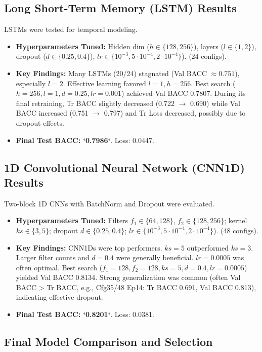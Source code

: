 \documentclass[11pt, a4paper]{article}
\begin{document}
\subsection{Long Short-Term Memory (LSTM) Results}
LSTMs were tested for temporal modeling.
\begin{itemize}
    \item \textbf{Hyperparameters Tuned:} Hidden dim ($h \in \{128, 256\}$), layers ($l \in \{1, 2\}$), dropout ($d \in \{0.25, 0.4\}$), $lr \in \{10^{-3}, 5 \cdot 10^{-4}, 2 \cdot 10^{-4}\}$). (24 configs).
    \item \textbf{Key Findings:} Many LSTMs (20/24) stagnated (Val BACC $\approx 0.751$), especially $l=2$. Effective learning favored $l=1, h=256$. Best search ($h=256, l=1, d=0.25, lr=0.001$) achieved Val BACC 0.7807. During its final retraining, Tr BACC slightly decreased (0.722 $\to$ 0.690) while Val BACC increased (0.751 $\to$ 0.797) and Tr Loss decreased, possibly due to dropout effects.
    \item \textbf{Final Test BACC: `0.7986`}. Loss: 0.0447.
\end{itemize}

\subsection{1D Convolutional Neural Network (CNN1D) Results}
\label{ssec:cnn1d_results}
Two-block 1D CNNs with BatchNorm and Dropout were evaluated.
\begin{itemize}
    \item \textbf{Hyperparameters Tuned:} Filters $f_1 \in \{64, 128\}$, $f_2 \in \{128, 256\}$; kernel $ks \in \{3, 5\}$; dropout $d \in \{0.25, 0.4\}$; $lr \in \{10^{-3}, 5 \cdot 10^{-4}, 2 \cdot 10^{-4}\}$). (48 configs).
    \item \textbf{Key Findings:} CNN1Ds were top performers. $ks=5$ outperformed $ks=3$. Larger filter counts and $d=0.4$ were generally beneficial. $lr=0.0005$ was often optimal. Best search ($f_1=128, f_2=128, ks=5, d=0.4, lr=0.0005$) yielded Val BACC 0.8134. Strong generalization was common (often Val BACC > Tr BACC, e.g., Cfg35/48 Ep14: Tr BACC 0.691, Val BACC 0.813), indicating effective dropout.
    \item \textbf{Final Test BACC: `0.8201`}. Loss: 0.0381.
\end{itemize}

\subsection{Final Model Comparison and Selection}
\end{document}
